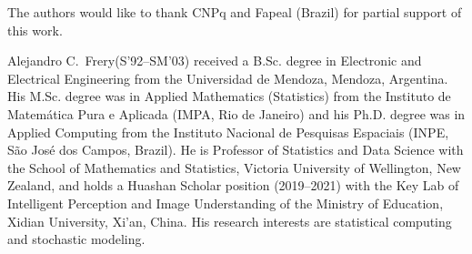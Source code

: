 \documentclass[journal,twoside]{IEEEtran}
\begin{document}
The authors would like to thank CNPq and Fapeal (Brazil) for partial support of this work.


	

\begin{IEEEbiography}{Alejandro C.\ Frery}(S'92--SM'03)
received a B.Sc. degree in Electronic and Electrical Engineering from the Universidad de Mendoza, Mendoza, Argentina.
His M.Sc. degree was in Applied Mathematics (Statistics) from the Instituto de Matem\'atica Pura e Aplicada (IMPA, Rio de Janeiro) and his Ph.D. degree was in Applied Computing from the Instituto Nacional de Pesquisas Espaciais (INPE, S\~ao Jos\'e dos Campos, Brazil).
He is Professor of Statistics and Data Science with the School of Mathematics and Statistics, Victoria University of Wellington, New Zealand, and holds a Huashan Scholar position (2019--2021) with the Key Lab of Intelligent Perception and Image Understanding of the Ministry of Education, Xidian University, Xi'an, China.
His research interests are statistical computing and stochastic modeling.
\end{IEEEbiography}
\end{document}
